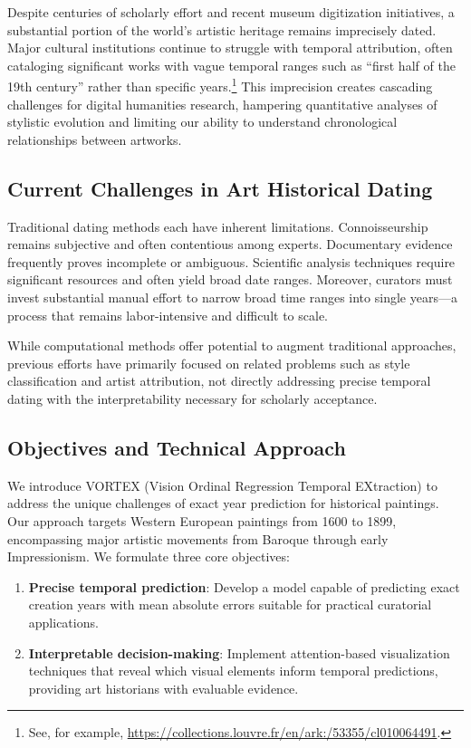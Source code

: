 \documentclass[10pt,twocolumn,letterpaper]{article}
\begin{document}
Despite centuries of scholarly effort and recent museum digitization initiatives, a substantial portion of the world's artistic heritage remains imprecisely dated. Major cultural institutions continue to struggle with temporal attribution, often cataloging significant works with vague temporal ranges such as ``first half of the 19th century'' rather than specific years.\footnote{See, for example, \url{https://collections.louvre.fr/en/ark:/53355/cl010064491}.} This imprecision creates cascading challenges for digital humanities research, hampering quantitative analyses of stylistic evolution and limiting our ability to understand chronological relationships between artworks.

\subsection{Current Challenges in Art Historical Dating}

Traditional dating methods each have inherent limitations. Connoisseurship remains subjective and often contentious among experts. Documentary evidence frequently proves incomplete or ambiguous. Scientific analysis techniques require significant resources and often yield broad date ranges. Moreover, curators must invest substantial manual effort to narrow broad time ranges into single years—a process that remains labor-intensive and difficult to scale.

While computational methods offer potential to augment traditional approaches, previous efforts have primarily focused on related problems such as style classification and artist attribution, not directly addressing precise temporal dating with the interpretability necessary for scholarly acceptance.

\subsection{Objectives and Technical Approach}

We introduce VORTEX (Vision Ordinal Regression Temporal EXtraction) to address the unique challenges of exact year prediction for historical paintings. Our approach targets Western European paintings from 1600 to 1899, encompassing major artistic movements from Baroque through early Impressionism. We formulate three core objectives:

\begin{enumerate}[leftmargin=1.2em,label=(\arabic*)]
    \item \textbf{Precise temporal prediction}: Develop a model capable of predicting exact creation years with mean absolute errors suitable for practical curatorial applications.

    \item \textbf{Interpretable decision-making}: Implement attention-based visualization techniques that reveal which visual elements inform temporal predictions, providing art historians with evaluable evidence.
\end{enumerate}
\end{document}
